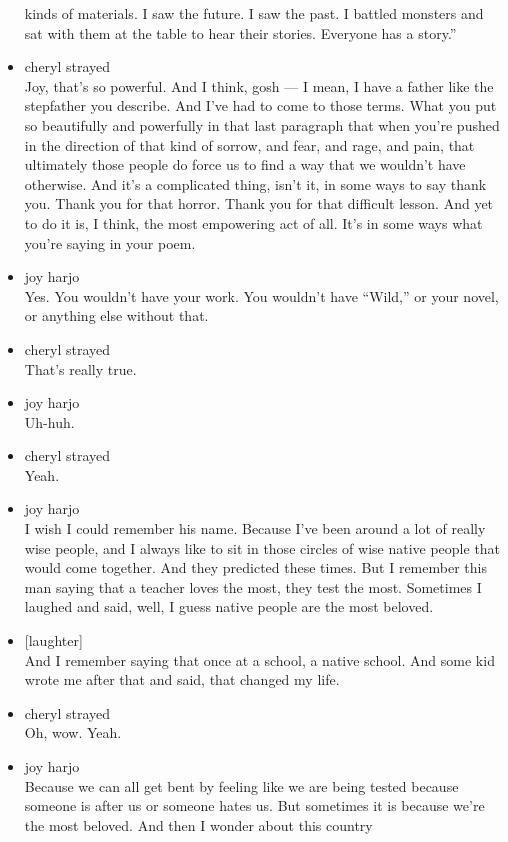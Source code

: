 \begin{itemize}
  kinds of materials. I saw the future. I saw the past. I battled
  monsters and sat with them at the table to hear their stories.
  Everyone has a story.''
\item
  cheryl strayed\\
  Joy, that's so powerful. And I think, gosh --- I mean, I have a father
  like the stepfather you describe. And I've had to come to those terms.
  What you put so beautifully and powerfully in that last paragraph that
  when you're pushed in the direction of that kind of sorrow, and fear,
  and rage, and pain, that ultimately those people do force us to find a
  way that we wouldn't have otherwise. And it's a complicated thing,
  isn't it, in some ways to say thank you. Thank you for that horror.
  Thank you for that difficult lesson. And yet to do it is, I think, the
  most empowering act of all. It's in some ways what you're saying in
  your poem.
\item
  joy harjo\\
  Yes. You wouldn't have your work. You wouldn't have ``Wild,'' or your
  novel, or anything else without that.
\item
  cheryl strayed\\
  That's really true.
\item
  joy harjo\\
  Uh-huh.
\item
  cheryl strayed\\
  Yeah.
\item
  joy harjo\\
  I wish I could remember his name. Because I've been around a lot of
  really wise people, and I always like to sit in those circles of wise
  native people that would come together. And they predicted these
  times. But I remember this man saying that a teacher loves the most,
  they test the most. Sometimes I laughed and said, well, I guess native
  people are the most beloved.
\item
  {[}laughter{]}\\
  And I remember saying that once at a school, a native school. And some
  kid wrote me after that and said, that changed my life.
\item
  cheryl strayed\\
  Oh, wow. Yeah.
\item
  joy harjo\\
  Because we can all get bent by feeling like we are being tested
  because someone is after us or someone hates us. But sometimes it is
  because we're the most beloved. And then I wonder about this country

\end{itemize}
